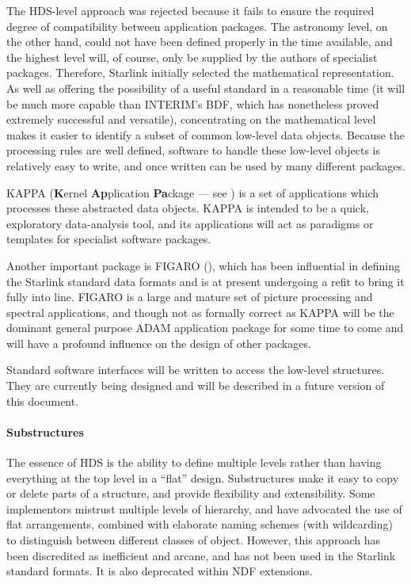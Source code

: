 The HDS-level approach was rejected because it fails to ensure the
required degree of compatibility between application packages.
The astronomy level, on the other hand, could not
have been defined properly in the time available, and
the highest level will, of course,
only be supplied by the authors of specialist
packages. Therefore, Starlink initially selected the mathematical
representation. As well as offering the
possibility of a useful standard in a reasonable time (it will
be much more capable than INTERIM's BDF, which has nonetheless
proved extremely successful and versatile),
concentrating on the mathematical level
makes it easier to identify a subset of common
low-level data objects.  Because the processing rules are
well defined, software to handle
these low-level objects is relatively easy to write,
and once written can be used by many different packages. 

{\small KAPPA} ({\bf K}ernel {\bf Ap}plication {\bf Pa}ckage ---
see ) is a set of
applications which processes these abstracted data
objects.  {\small KAPPA} is
intended to be a quick, exploratory data-analysis tool, and its
applications will act as paradigms
or templates for specialist software packages.

Another important package is {\small FIGARO} (), which
has been influential in defining the Starlink
standard data formats and is at present undergoing a refit
to bring it fully into line.
{\small FIGARO} is a large and mature set of picture processing
and spectral
applications, and though not as formally
correct as {\small KAPPA} will be the
dominant general purpose {\small ADAM} application package for some
time to come and will have a profound influence on the
design of other packages.

Standard software interfaces will be written to access the low-level
structures.  They are currently being designed
and will be described
in a future version of this document.

\paragraph{Substructures}
The essence of HDS is the ability to define
multiple levels rather than having everything at the
top level in a ``flat'' design.
Substructures make it easy to copy or delete parts of a structure, and
provide flexibility and extensibility.  Some implementors
mistrust multiple levels of hierarchy, and have advocated
the use of flat arrangements, combined with elaborate
naming schemes (with wildcarding) to distinguish between different
classes of object.  However, this approach has been
discredited as inefficient and arcane, and has not been used
in the Starlink standard formats.  It is also deprecated
within NDF extensions.

